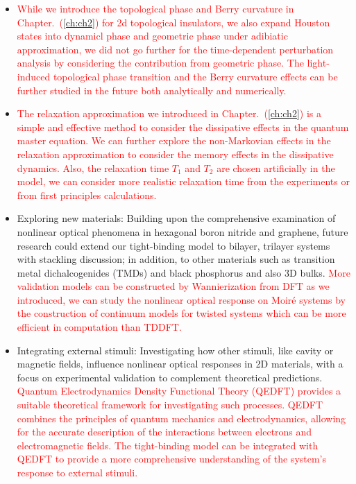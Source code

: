 \begin{itemize}
	\item \textcolor{red}{While we introduce the topological phase and Berry curvature in Chapter.~(\ref{ch:ch2}) for 2d topological insulators, we also expand Houston states into dynamicl phase and geometric phase under adibiatic approximation, we did not go further for the time-dependent perturbation analysis by considering the contribution from geometric phase. The light-induced topological phase transition and the Berry curvature effects can be further studied in the future both analytically and numerically.}

	\item \textcolor{red}{The relaxation approximation we introduced in Chapter.~(\ref{ch:ch2}) is a simple and effective method to consider the dissipative effects in the quantum master equation. We can further explore the non-Markovian effects in the relaxation approximation to consider the memory effects in the dissipative dynamics. Also, the relaxation time $T_1$ and $T_2$ are chosen artificially in the model, we can consider more realistic relaxation time from the experiments or from first principles calculations.}

	\item Exploring new materials: Building upon the comprehensive examination of nonlinear optical phenomena in hexagonal boron nitride and graphene, future research could extend our tight-binding model to bilayer, trilayer systems with stackling discussion; in addition, to other materials such as transition metal dichalcogenides (TMDs) and black phosphorus and also 3D bulks. \textcolor{red}{More validation models can be constructed by Wannierization from DFT as we introduced, we can study the nonlinear optical response on Moiré systems by the construction of continuum models for twisted systems which can be more efficient in computation than \gls{TDDFT}.}

	\item Integrating external stimuli: Investigating how other stimuli, like cavity or magnetic fields, influence nonlinear optical responses in 2D materials, with a focus on experimental validation to complement theoretical predictions. \textcolor{red}{Quantum Electrodynamics Density Functional Theory (QEDFT) provides a suitable theoretical framework for investigating such processes. QEDFT combines the principles of quantum mechanics and electrodynamics, allowing for the accurate description of the interactions between electrons and electromagnetic fields. The tight-binding model can be integrated with QEDFT to provide a more comprehensive understanding of the system's response to external stimuli.}


\end{itemize}
